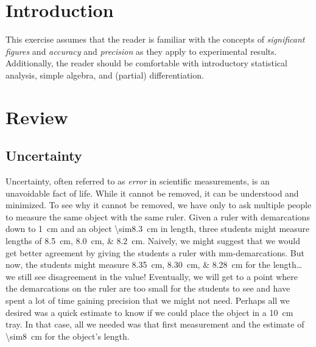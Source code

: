 \maketitle

\begin{abstract}
	\noindent
	In this exercise, students will be introduced to basic concepts in scientific error analysis and the propagation of error in calculations. 
	Upon completion, you should be familiar with the sources of experimental error, be able to track the impact of those errors through a series of calculations, and accurately report the uncertainty in your final reported values. %
\end{abstract}

\section{Introduction} %
\label{sec:intro}

This exercise assumes that the reader is familiar with the concepts of \emph{significant figures} and \emph{accuracy} and \emph{precision} as they apply to experimental results. 
Additionally, the reader should be comfortable with introductory statistical analysis, simple algebra, and (partial) differentiation. 



\section{Review} %
\label{sec:review}

\subsection{Uncertainty} %
\label{sub:uncertainty}

Uncertainty, often referred to as \emph{error} in scientific measurements, is an unavoidable fact of life. 
While it cannot be removed, it can be understood and minimized. 
To see why it cannot be removed, we have only to ask multiple people to measure the same object with the same ruler. 
Given a ruler with demarcations down to \qty{1}{\cm} and an object \qty{\sim8.3}{\cm} in length, three students might measure lengths of \SIlist{8.5;8.0;8.2}{\cm}. 
Naively, we might suggest that we would get better agreement by giving the students a ruler with \unit{\mm}-demarcations. 
But now, the students might measure \SIlist{8.35;8.30;8.28}{\cm} for the length… we still see disagreement in the value! 
Eventually, we will get to a point where the demarcations on the ruler are too small for the students to see and have spent a lot of time gaining precision that we might not need.
Perhaps all we desired was a quick estimate to know if we could place the object in a \qty{10}{\cm} tray. 
In that case, all we needed was that first measurement and the estimate of \qty{\sim8}{\cm} for the object's length. 

